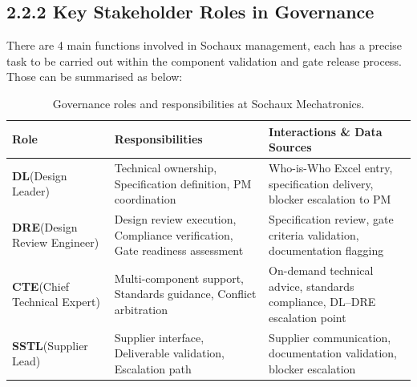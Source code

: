 \subsection*{\textcolor[HTML]{003D99}{2.2.2 Key Stakeholder Roles in Governance}}

There are 4 main functions involved in Sochaux management, each has a precise task to be carried out within the component validation and gate release process. Those can be summarised as below:
\vspace{0.3cm}


\begin{table}[H]
\centering
\small
\setlength{\tabcolsep}{8pt}
\renewcommand{\arraystretch}{2.2}
\caption{Governance roles and responsibilities at Sochaux Mechatronics.}
\label{tab:governance-roles}
\begin{tabularx}{\textwidth}{|>{\raggedright\arraybackslash}X|>{\raggedright\arraybackslash}X|>{\raggedright\arraybackslash}X|}
\hline
\cellcolor[HTML]{E6F2FF}\textcolor[HTML]{003D99}{\textbf{Role}} & \cellcolor[HTML]{E6F2FF}\textcolor[HTML]{333333}{\textbf{Responsibilities}} & \cellcolor[HTML]{E6F2FF}\textcolor[HTML]{006600}{\textbf{Interactions \& Data Sources}} \\
\hline
\textbf{DL}\newline(Design Leader) & Technical ownership, Specification definition, PM coordination & Who-is-Who Excel entry, specification delivery, blocker escalation to PM \\
\hline
\textbf{DRE}\newline(Design Review Engineer) & Design review execution, Compliance verification, Gate readiness assessment & Specification review, gate criteria validation, documentation flagging \\
\hline
\textbf{CTE}\newline(Chief Technical Expert) & Multi-component support, Standards guidance, Conflict arbitration & On-demand technical advice, standards compliance, DL--DRE escalation point \\
\hline
\textbf{SSTL}\newline(Supplier Lead) & Supplier interface, Deliverable validation, Escalation path & Supplier communication, documentation validation, blocker escalation \\
\hline
\end{tabularx}
\end{table}

\vspace{0.2cm}


